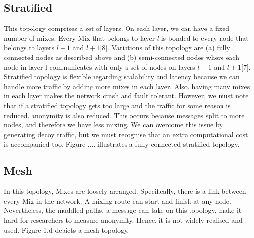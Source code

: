 \documentclass[logo,msc,cyber]{infthesis}   %
\begin{document}
\subsection{Stratified}
This topology comprises a set of layers. On each layer, we can have a fixed
number of mixes. Every Mix that belongs to layer $l$ is bonded to every node
that belongs to layers $l-1$ and $l+1$[8]. Variations of this topology are (a)
fully connected nodes as described above and (b) semi-connected nodes where each
node in layer l communicates with only a set of nodes on layers $l-1$ and
$l+1$[7]. Stratified topology is flexible regarding scalability and latency
because we can handle more traffic by adding more mixes in each layer. Also,
having many mixes in each layer makes the network crash and fault tolerant.
However, we must note that if a stratified topology gets too large and the
traffic for some reason is reduced, anonymity is also reduced. This occurs
because messages split to more nodes, and therefore we have less mixing. We can
overcome this issue by generating decoy traffic, but we must recognise that an
extra computational cost is accompanied too. Figure .... illustrates a fully
connected stratified topology.

\subsection{Mesh}
In this topology, Mixes are loosely arranged. Specifically, there is a link
between every Mix in the network. A mixing route can start and finish at any
node. Nevertheless, the muddled paths, a message can take on this topology, make
it hard for researchers to measure anonymity. Hence, it is not widely realised
and used. Figure 1.d depicts a mesh topology.
\end{document}
